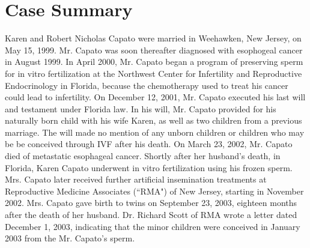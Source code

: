 \documentclass[letterpaper,10pt,twoside]{article}
\begin{document}
\section*{Case Summary}
Karen and Robert Nicholas Capato were married in Weehawken, New Jersey, on May 15, 1999.  Mr. Capato was soon thereafter diagnosed with esophogeal cancer in August 1999.  In April 2000, Mr. Capato began a program of preserving sperm for in vitro fertilization at the Northwest Center for Infertility and Reproductive Endocrinology in Florida, because the chemotherapy used to treat his cancer could lead to infertility.  On December 12, 2001, Mr. Capato executed his last will and testament under Florida law.  In his will, Mr. Capato provided for his naturally born child with his wife Karen, as well as two children from a previous marriage. The will made no mention of any unborn children or children who may be be conceived through IVF after his death.  On March 23, 2002, Mr. Capato died of metastatic esophageal cancer.  Shortly after her husband's death, in Florida, Karen Capato underwent in vitro fertilization using his frozen sperm.  Mrs. Capato later received further artificial insemination treatments at Reproductive Medicine Associates (``RMA") of New Jersey, starting in November 2002.  Mrs. Capato gave birth to twins on September 23, 2003, eighteen months after the death of her husband.  Dr. Richard Scott of RMA wrote a letter dated December 1, 2003, indicating that the minor children were conceived in January 2003 from the Mr. Capato's sperm.
\end{document}
